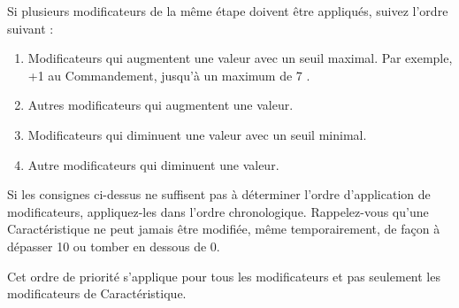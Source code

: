 Si plusieurs modificateurs de la même étape doivent être appliqués, suivez l'ordre suivant :
\begin{enumerate}
\item Modificateurs qui augmentent une valeur avec un seuil maximal. Par exemple, \og +1 au Commandement, jusqu'à un maximum de 7 \fg{}.
\item Autres modificateurs qui augmentent une valeur.
\item Modificateurs qui diminuent une valeur avec un seuil minimal.
\item Autre modificateurs qui diminuent une valeur.
\end{enumerate}

Si les consignes ci-dessus ne suffisent pas à déterminer l'ordre d'application de modificateurs, appliquez-les dans l'ordre chronologique. Rappelez-vous qu'une Caractéristique ne peut jamais être modifiée, même temporairement, de façon à dépasser 10 ou tomber en dessous de 0.

Cet ordre de priorité s'applique pour tous les modificateurs et pas seulement les modificateurs de Caractéristique.

